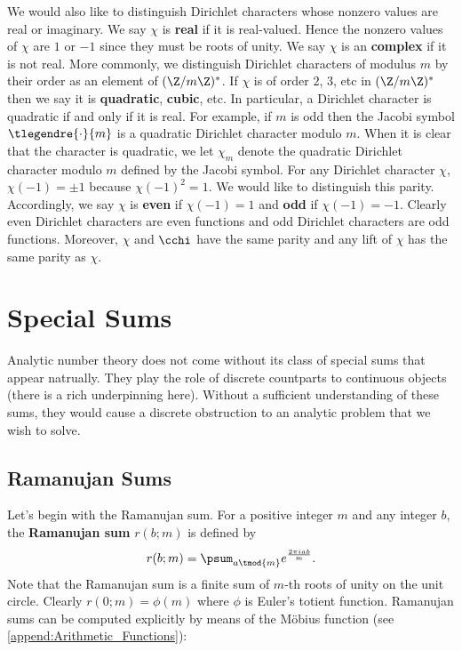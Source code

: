       We would also like to distinguish Dirichlet characters whose nonzero values are real or imaginary. We say $\chi$ is \textbf{real} if it is real-valued. Hence the nonzero values of $\chi$ are $1$ or $-1$ since they must be roots of unity. We say $\chi$ is an \textbf{complex} if it is not real. More commonly, we distinguish Dirichlet characters of modulus $m$ by their order as an element of $(\Z/m\Z)^{\ast}$. If $\chi$ is of order $2$, $3$, etc in $(\Z/m\Z)^{\ast}$ then we say it is \textbf{quadratic}, \textbf{cubic}, etc. In particular, a Dirichlet character is quadratic if and only if it is real. For example, if $m$ is odd then the Jacobi symbol $\tlegendre{\cdot}{m}$ is a quadratic Dirichlet character modulo $m$. When it is clear that the character is quadratic, we let $\chi_{m}$ denote the quadratic Dirichlet character modulo $m$ defined by the Jacobi symbol. For any Dirichlet character $\chi$, $\chi(-1) = \pm 1$ because $\chi(-1)^{2} = 1$. We would like to distinguish this parity. Accordingly, we say $\chi$ is \textbf{even} if $\chi(-1) = 1$ and \textbf{odd} if $\chi(-1) = -1$. Clearly even Dirichlet characters are even functions and odd Dirichlet characters are odd functions. Moreover, $\chi$ and $\cchi$ have the same parity and any lift of $\chi$ has the same parity as $\chi$.
    \section{Special Sums}
      Analytic number theory does not come without its class of special sums that appear natrually. They play the role of discrete countparts to continuous objects (there is a rich underpinning here). Without a sufficient understanding of these sums, they would cause a discrete obstruction to an analytic problem that we wish to solve.
      \subsection*{Ramanujan Sums}
        Let's begin with the Ramanujan sum. For a positive integer $m$ and any integer $b$, the \textbf{Ramanujan sum} $r(b;m)$ is defined by
        \[
          r(b;m) = \psum_{a \tmod{m}}e^{\frac{2\pi iab}{m}}.
        \]
        Note that the Ramanujan sum is a finite sum of $m$-th roots of unity on the unit circle. Clearly $r(0;m) = \phi(m)$ where $\phi$ is Euler's totient function. Ramanujan sums can be computed explicitly by means of the M\"obius function (see \cref{append:Arithmetic_Functions}):


